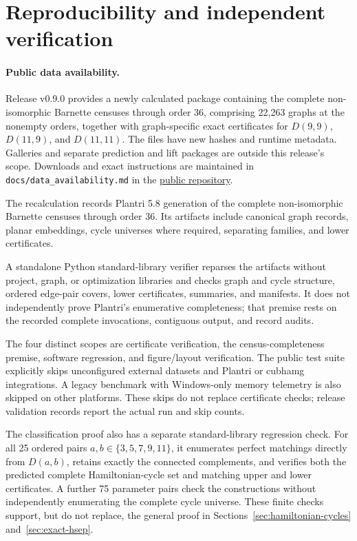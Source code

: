 \section{Reproducibility and independent verification}
\label{sec:reproducibility}

\paragraph{Public data availability.}
Release v0.9.0 provides a newly calculated package containing the complete
non-isomorphic Barnette censuses through order 36, comprising 22,263
graphs at the nonempty orders, together with graph-specific exact certificates
for $D(9,9)$, $D(11,9)$, and $D(11,11)$.  The files have new hashes and
runtime metadata.  Galleries and separate prediction and lift packages are
outside this release's scope.  Downloads and exact instructions are maintained
in \texttt{docs/data\_availability.md} in the
\href{https://github.com/derdualeraum-Regensburg/barnette-search}{public repository}.

The recalculation records Plantri 5.8 generation of the complete
non-isomorphic Barnette censuses through order 36.  Its artifacts include
canonical graph records, planar embeddings, cycle universes where required,
separating families, and lower certificates.

A standalone Python standard-library verifier reparses the artifacts without
project, graph, or optimization libraries and checks graph and cycle structure,
ordered edge-pair covers, lower certificates, summaries, and manifests.  It
does not independently prove Plantri's enumerative completeness; that premise
rests on the recorded complete invocations, contiguous output, and record
audits.

The four distinct scopes are certificate verification, the census-completeness
premise, software regression, and figure/layout verification.  The public test
suite explicitly skips unconfigured external datasets and Plantri or
cubhamg integrations.  A legacy benchmark with Windows-only memory telemetry
is also skipped on other platforms.  These skips do not replace certificate
checks; release validation records report the actual run and skip counts.

The classification proof also has a separate standard-library regression
check.  For all 25 ordered pairs \(a,b\in\{3,5,7,9,11\}\), it enumerates
perfect matchings directly from \(D(a,b)\), retains exactly the connected
complements, and verifies both the predicted complete Hamiltonian-cycle set
and matching upper and lower certificates.  A further 75 parameter pairs
check the constructions without independently enumerating the complete cycle
universe.  These finite checks support, but do not replace, the general proof
in Sections~\ref{sec:hamiltonian-cycles} and~\ref{sec:exact-hsep}.

